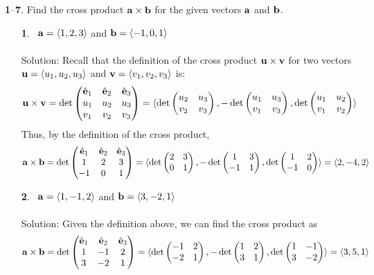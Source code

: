 \documentclass[12pt]{amsbook}
\newcommand{\la}{\langle}
\newcommand{\ra}{\rangle}
\begin{document}
\noindent
{\small\bf 1}--{\small\bf 7}. Find the cross product ${\bf a}\times{\bf b}$ 
for the given vectors ${\bf a}$ and ${\bf b}$.
\begin{enumerate}
\item[{\small\bf 1}.]\
${\bf a}=\la 1,2,3\ra$ and ${\bf b}=\la -1,0,1\ra$ 
\\
\\
{\sc Solution}:
Recall that the definition of the cross product ${\bf u}\times{\bf v}$ for two vectors ${\bf u}=\la u_1,u_2,u_3 \ra$ and ${\bf v}=\la v_1,v_2,v_3 \ra$ is:
$${\bf u}\times{\bf v}=\det
\begin{pmatrix}
\hat{\bf e}_1 & \hat{\bf e}_2 & \hat{\bf e}_3\cr u_1&u_2&u_3\cr v_1&v_2&v_3 \end{pmatrix}=\la \det\begin{pmatrix}u_2&u_3\cr v_2&v_3  \end{pmatrix}, -\det\begin{pmatrix}u_1&u_3\cr v_1&v_3  \end{pmatrix}, \det\begin{pmatrix}u_1&u_2\cr v_1&v_2 \end{pmatrix} \ra$$
Thus, by the definition of the cross product,
$${\bf a}\times{\bf b}=\det
\begin{pmatrix}
\hat{\bf e}_1 & \hat{\bf e}_2 & \hat{\bf e}_3\cr 1&2&3\cr -1&0&1 \end{pmatrix}=\la \det\begin{pmatrix}2&3\cr 0&1  \end{pmatrix}, -\det\begin{pmatrix}1&3\cr -1&1  \end{pmatrix}, \det\begin{pmatrix}1&2\cr -1&0 \end{pmatrix} \ra = \la 2,-4,2 \ra$$
\item[{\small\bf 2}.]\ ${\bf a}=\la 1,-1,2\ra$ and ${\bf b}=\la 3,-2,1\ra$
\\
\\
{\sc Solution}:
Given the definition above, we can find the cross product as
$${\bf a}\times{\bf b}=\det\begin{pmatrix} \hat{\bf e}_1 & \hat{\bf e}_2 & \hat{\bf e}_3\cr 1&-1&2\cr 3&-2&1 \cr \end{pmatrix}= \la \det\begin{pmatrix}
-1&2\cr -2&1\cr \end{pmatrix},-\det\begin{pmatrix} 1&2\cr 3&1\cr \end{pmatrix},\det\begin{pmatrix} 1&-1\cr 3&-2\cr \end{pmatrix}\ra =\la 3,5,1 \ra $$

\end{enumerate}
\end{document}
